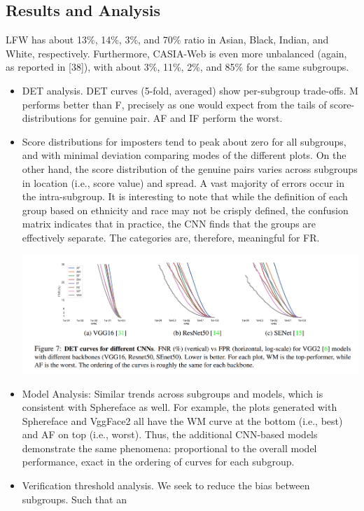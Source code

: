 \documentclass[12pt]{article}
\begin{document}
\subsection{Results and Analysis}
LFW has about 13\%, 14\%, 3\%, and 70\% ratio in
Asian, Black, Indian, and White, respectively. Furthermore, CASIA-Web is even more unbalanced
(again, as reported in [38]), with about 3\%, 11\%,
2\%, and 85\% for the same subgroups.
\begin{itemize}
  \item DET analysis. DET curves (5-fold, averaged)
  show per-subgroup trade-offs. M performs better than F, precisely as one would
  expect from the tails of score-distributions for genuine pair. AF and IF perform the worst.
  \item Score distributions for imposters
  tend to peak about zero for all subgroups, and with
  minimal deviation comparing modes of the different plots. On the other hand, the score distribution of the genuine pairs varies across subgroups in
  location (i.e., score value) and spread. A vast majority of errors occur in the
  intra-subgroup. It is interesting to note that while
  the definition of each group based on ethnicity and
  race may not be crisply defined, the confusion matrix indicates that in practice, the CNN finds that
  the groups are effectively separate. The categories
  are, therefore, meaningful for FR.
  \begin{center}
    \includegraphics[scale = 0.7]{img13.png}
  \end{center}
  \item Model Analysis: Similar trends across
  subgroups and models, which is consistent with
  Sphereface as well. For example, the plots
  generated with Sphereface and VggFace2 all have
  the WM curve at the bottom (i.e., best) and AF on
  top (i.e., worst). Thus, the additional CNN-based
  models demonstrate the same phenomena: proportional to the overall model performance, exact in
  the ordering of curves for each subgroup.
  \item Verification threshold analysis. We seek to reduce the bias between subgroups. Such that an

\end{itemize}
\end{document}
